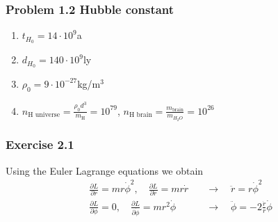 \documentclass[10pt,a4paper]{article}
\theoremstyle{definition}
\begin{document}
\subsubsection{Problem 1.2 Hubble constant}
\begin{enumerate}
\item $t_{H_0}=14\cdot10^{9}$a
\item $d_{H_0}=140\cdot10^{9}$ly
\item $\rho_0=9\cdot10^{-27}$kg/m$^3$
\item $n_\text{H universe}=\frac{\rho_0 d^3}{m_\text{H}}=10^{79}$, $n_\text{H brain}=\frac{m_\text{brain}}{m_{H_2O}}=10^{26}$
\end{enumerate}

\subsubsection{Exercise 2.1}
Using the Euler Lagrange equations we obtain
\begin{align}
\frac{\partial L}{\partial r}=mr\dot\phi^2,\quad\frac{\partial L}{\partial\dot r}=mr\dot r\quad&\rightarrow\quad\ddot r=r\dot\phi^2\\
\frac{\partial L}{\partial \phi}=0,\quad\frac{\partial L}{\partial\dot\phi}=mr^2\dot \phi\quad&\rightarrow\quad\ddot\phi=-2\frac{\dot r}{r}\dot\phi
\end{align}
\end{document}
